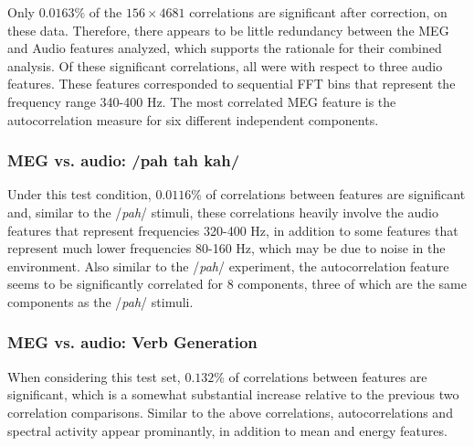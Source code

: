 \documentclass[utf8]{frontiersSCNS} %
\begin{document}
Only $0.0163$\% of the $156 \times 4681$ correlations are significant after correction, on these data. Therefore, there appears to be little redundancy between the MEG and Audio features analyzed, which supports the rationale for their combined analysis. Of these significant correlations, all were with respect to three audio features. These features corresponded to sequential FFT bins that represent the frequency range 340-400 Hz. The most correlated MEG feature is the autocorrelation measure for six different independent components.

\subsubsection{MEG vs. audio: /pah tah kah/}

Under this test condition, $0.0116$\% of correlations between features are significant and, similar to the /{\em pah}/ stimuli, these correlations heavily involve the audio features that represent frequencies 320-400 Hz, in addition to some features that represent much lower frequencies 80-160 Hz, which may be due to noise in the environment. Also similar to the /{\em pah}/ experiment, the autocorrelation feature seems to be significantly correlated for 8 components, three of which are the same components as the /{\em pah}/ stimuli.


\subsubsection{MEG vs. audio: Verb Generation}

When considering this test set, $0.132$\% of correlations between features are significant, which is a somewhat substantial increase relative to the previous two correlation comparisons. Similar to the above correlations, autocorrelations and spectral activity appear prominantly, in addition to mean and energy features. 
\end{document}
